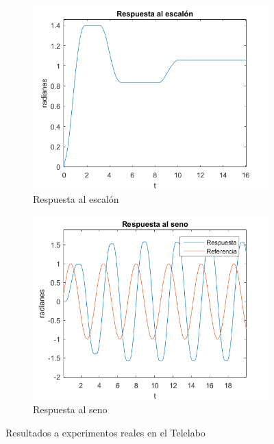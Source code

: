 \documentclass[a4paper]{article}
\begin{document}
\begin{figure}[htp]
	\centering
	\begin{subfigure}{0.45\textwidth}
		\centering
		\includegraphics[width=\textwidth]{respuesta_labo}
		\caption{Respuesta al escalón}
		\label{escalonreal}
	\end{subfigure}
	\begin{subfigure}{0.45\textwidth}
		\centering
		\includegraphics[width=\textwidth]{respuesta_seno}
		\caption{Respuesta al seno}
		\label{seno}
	\end{subfigure}
	\caption{Resultados a experimentos reales en el Telelabo}
	\label{real}
\end{figure}
\end{document}
